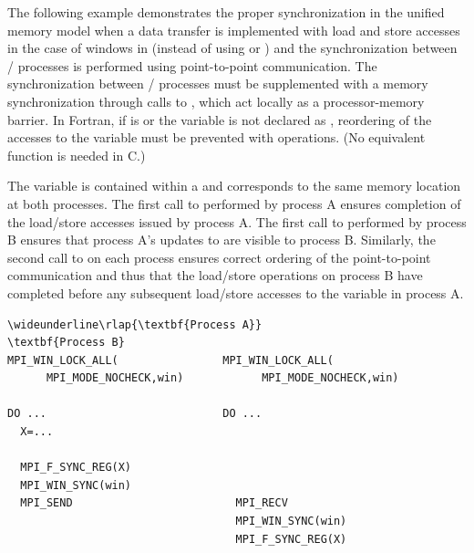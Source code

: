 \begin{example}\label{ex:shmem-sync}%
The following example demonstrates the proper synchronization in the
unified memory model when a data transfer is implemented with load and
store accesses in the case of windows in  (instead of using  or
) and the synchronization between \mpi/ processes is performed using
point-to-point communication. The synchronization between \mpi/ processes
must be supplemented with a memory synchronization through calls to
, which act locally as a processor-memory barrier. In
Fortran, if  is
%
or the variable  is not declared as ,
%
reordering of the accesses to the
variable  must be prevented with 
operations. (No equivalent function is needed in C.)

The variable  is contained within a  and 
corresponds to the same memory location at both processes. The first call to
 performed by process A ensures completion of
the load/store accesses issued by process A. The first call to 
performed by process B ensures that process A's updates to 
are visible to process B.
Similarly, the second call to  on each process ensures
correct ordering of the point-to-point communication and thus that the load/store
operations on process B have completed before any subsequent
load/store accesses to the variable  in process A.

%
%
%
\begin{Verbatim}[commandchars=\\\{\}]
\wideunderline\rlap{\textbf{Process A}}                                 \textbf{Process B}
MPI_WIN_LOCK_ALL(                MPI_WIN_LOCK_ALL(
      MPI_MODE_NOCHECK,win)            MPI_MODE_NOCHECK,win)

DO ...                           DO ...
  X=...

  MPI_F_SYNC_REG(X)
  MPI_WIN_SYNC(win)
  MPI_SEND                         MPI_RECV
                                   MPI_WIN_SYNC(win)
                                   MPI_F_SYNC_REG(X)


\end{Verbatim}
\end{example}
